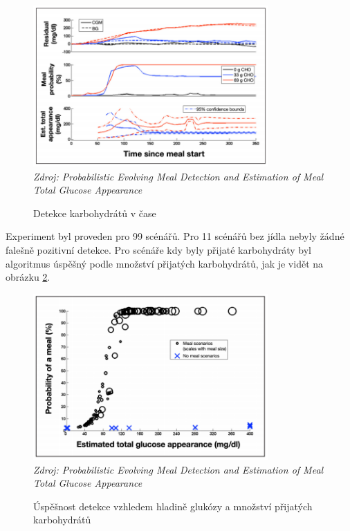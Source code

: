 \begin{figure}[H]
\caption{Detekce karbohydrátů v čase}
\label{fig:diff1}
\centering
\includegraphics[width=0.8\textwidth]{img/analyza/diff1.png}\\
\textit{Zdroj: Probabilistic Evolving Meal Detection and Estimation of Meal Total Glucose Appearance \citep{Analyza.Diff}}
\end{figure}

Experiment byl proveden pro 99 scénářů. Pro 11 scénářů bez jídla nebyly žádné falešně pozitivní detekce. Pro scénáře kdy byly přijaté karbohydráty byl algoritmus úspěšný podle množství přijatých karbohydrátů, jak je vidět na obrázku \ref{fig:diff2}.

\begin{figure}[H]
\caption{Úspěšnost detekce vzhledem hladině glukózy a množství přijatých karbohydrátů}
\label{fig:diff2}
\centering
\includegraphics[width=0.8\textwidth]{img/analyza/diff2.png}\\
\textit{Zdroj: Probabilistic Evolving Meal Detection and Estimation of Meal Total Glucose Appearance \citep{Analyza.Diff}}
\end{figure}


